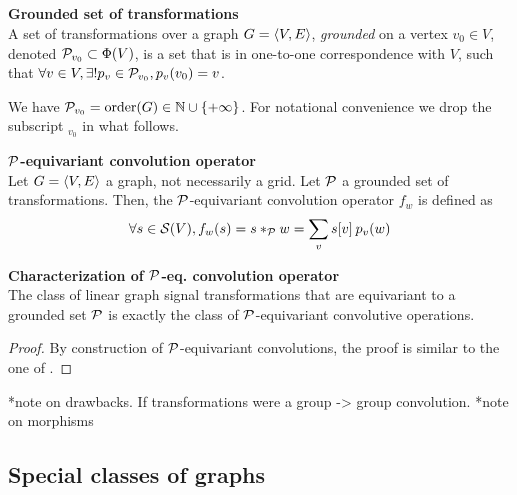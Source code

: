 \subsection{}



\begin{definition}\textbf{Grounded set of transformations}\\
A set of transformations over a graph $\gve$, \emph{grounded} on a vertex $v_0 \in V$, denoted $\cp_{v_0} \subset \Phi(V)$, is a set that is in one-to-one correspondence with $V$, such that $\forall v \in V, \exists! p_v \in \cp_{v_0}, p_v(v_0) = v$.
\end{definition}

We have $\cp_{v_0} = \order(G) \in \bbn \cup \{+\infty\}$. For notational convenience we drop the subscript $_{v_0}$ in what follows.

\begin{definition}\textbf{$\cp$-equivariant convolution operator}\\
Let $\gve$ a graph, not necessarily a grid. Let $\cp$ a grounded set of transformations. Then, the  $\cp$-equivariant convolution operator $f_w$ is defined as
\begin{gather*}
\forall s \in \cs(V), f_w(s) = s \ast_{\cp} w = \displaystyle \sum_v s[v] \h{2} p_v(w)
\end{gather*}
\end{definition}

\begin{claim}\textbf{Characterization of $\cp$-eq. convolution operator}\\
The class of linear graph signal transformations that are equivariant to a grounded set $\cp$ is exactly the class of $\cp$-equivariant convolutive operations.
\end{claim}

\begin{proof}
By construction of $\cp$-equivariant convolutions, the proof is similar to the one of .
\end{proof}



*note on drawbacks. If transformations were a group -> group convolution.
*note on morphisms

\subsection{Special classes of graphs}


